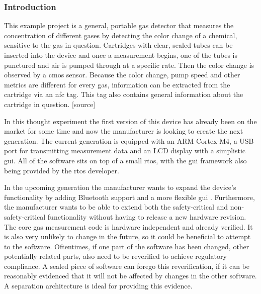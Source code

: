 \subsubsection{Introduction}
This example project is a general, portable gas detector that measures the concentration of different gases by detecting the color change of a chemical, sensitive to the gas in question. Cartridges with clear, sealed tubes can be inserted into the device and once a measurement begins, one of the tubes is punctured and air is pumped through at a specific rate. Then the color change is observed by a \acrshort{cmos} sensor. Because the color change, pump speed and other metrics are different for every gas, information can be extracted from the cartridge via an \acrshort{nfc} tag. This tag also contains general information about the cartridge in question. [source]

In this thought experiment the first version of this device has already been on the market for some time and now the manufacturer is looking to create the next generation. The current generation is equipped with an ARM Cortex-M4, a USB port for transmitting measurement data and an LCD display with a simplistic \acrshort{gui}. All of the software sits on top of a small \acrshort{rtos}, with the \acrshort{gui} framework also being provided by the \acrshort{rtos} developer.

In the upcoming generation the manufacturer wants to expand the device's functionality by adding Bluetooth support and a more flexible \acrshort{gui} . Furthermore, the manufacturer wants to be able to extend both the safety-critical and non-safety-critical functionality without having to release a new hardware revision. The core gas measurement code is hardware independent and already verified. It is also very unlikely to change in the future, so it could be beneficial to attempt to  the software. Oftentimes, if one part of the software has been changed, other potentially related parts, also need to be reverified to achieve regulatory compliance. A sealed piece of software can forego this reverification, if it can be reasonably evidenced that it will not be affected by changes in the other software. A separation architecture is ideal for providing this evidence.
